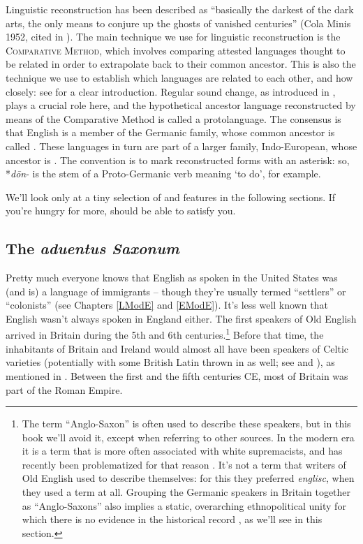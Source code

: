 Linguistic reconstruction has been described as ``basically the darkest of the dark arts, the only means to conjure up the ghosts of vanished centuries'' (Cola Minis 1952, cited in \citealp[107]{Campbell2013}). The main technique we use for linguistic reconstruction is the \textsc{Comparative Method}, which involves comparing attested languages thought to be related in order to extrapolate back to their common ancestor. This is also the technique we use to establish which languages are related to each other, and how closely: see \citet{Campbell2013} for a clear introduction. Regular sound change, as introduced in , plays a crucial role here, and the hypothetical ancestor language reconstructed by means of the Comparative Method is called a protolanguage. The consensus is that English is a member of the Germanic family, whose common ancestor is called . These languages in turn are part of a larger family, Indo-European, whose ancestor is . The convention is to mark reconstructed forms with an asterisk: so, *\emph{dōn}- is the stem of a Proto-Germanic verb meaning `to do', for example.

We'll look only at a tiny selection of  and  features in the following sections. If you're hungry for more, \citet{Ringe2017} should be able to satisfy you.

\subsection{The \emph{aduentus Saxonum}}\label{prehistory-arrival}
Pretty much everyone knows that English as spoken in the United States was (and is) a language of immigrants -- though they're usually termed ``settlers'' or ``colonists'' (see Chapters \ref{LModE} and \ref{EModE}). It's less well known that English wasn't always spoken in England either. The first speakers of Old English arrived in Britain during the 5th and 6th centuries.\footnote{The term ``Anglo-Saxon'' is often used to describe these speakers, but in this book we'll avoid it, except when referring to other sources. In the modern era it is a term that is more often associated with white supremacists, and has recently been problematized for that reason \citep{RambaranOlm2018,Wilton2020}. It's not a term that writers of Old English used to describe themselves: for this they preferred \emph{englisc}, when they used a term at all. Grouping the Germanic speakers in Britain together as ``Anglo-Saxons'' also implies a static, overarching ethnopolitical unity for which there is no evidence in the historical record \citep{Reynolds1985}, as we'll see in this section.} Before that time, the inhabitants of Britain and Ireland would almost all have been speakers of Celtic varieties (potentially with some British Latin thrown in as well; see \citealp{Schrijver2013} and \citealp{Halsall2013}), as mentioned in . Between the first and the fifth centuries CE, most of Britain was part of the Roman Empire.

